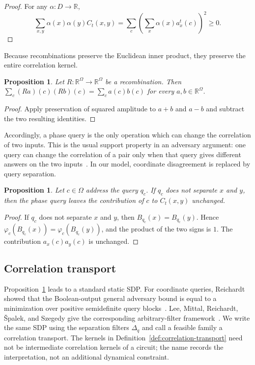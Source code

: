 \documentclass[11pt]{article}
\numberwithin{equation}{section}
\newtheorem{proposition}[definition]{Proposition}
\theoremstyle{remark}
\begin{document}
\begin{proof}
For any $\alpha:D\to\mathbb R$,
\begin{equation}
    \sum_{x,y}\alpha(x)\alpha(y)C_t(x,y)=\sum_c\left(\sum_x\alpha(x)a_x^t(c)\right)^2\geq0.
\end{equation}
\end{proof}

Because recombinations preserve the Euclidean inner product, they preserve the
entire correlation kernel.

\begin{proposition}
\label{prop:recombination-preserves-correlation}
Let $R:\mathbb R^\Omega\to\mathbb R^\Omega$ be a recombination. Then
$\sum_c(Ra)(c)(Rb)(c)=\sum_c a(c)b(c)$ for every
$a,b\in\mathbb R^\Omega$.
\end{proposition}

\begin{proof}
Apply preservation of squared amplitude to $a+b$ and $a-b$ and subtract the
two resulting identities.
\end{proof}

Accordingly, a phase query is the only operation which can change the correlation of two inputs. This is the usual support property in an adversary argument: one query can change the correlation of a pair only when that query gives different answers on the two inputs~\cite{HoyerLeeSpalek2007}. In our model, coordinate disagreement is replaced by query separation.

\begin{proposition}
\label{prop:query-correlation-support}
Let $c\in\Omega$ address the query $q_c$. If $q_c$ does not separate
$x$ and $y$, then the phase query leaves the contribution of $c$ to
$C_t(x,y)$ unchanged.
\end{proposition}

\begin{proof}
If $q_c$ does not separate $x$ and $y$, then
$B_{q_c}(x)=B_{q_c}(y)$. Hence
$\varphi_c(B_{q_c}(x))=\varphi_c(B_{q_c}(y))$, and the product of the two
signs is $1$. The contribution $a_x(c)a_y(c)$ is unchanged.
\end{proof}


\subsection{Correlation transport}
\label{subsec:static-correlation-transport}

Proposition~\ref{prop:query-correlation-support} leads to a standard static SDP. For coordinate queries, Reichardt showed that the Boolean-output general adversary bound is equal to a minimization over positive semidefinite query blocks~\cite{Reichardt2009}. Lee, Mittal, Reichardt, {\v S}palek, and Szegedy give the corresponding arbitrary-filter framework~\cite{LeeMittalReichardtSpalekSzegedy2011}. We write the same SDP using the separation filters $\Delta_q$ and call a feasible family a correlation transport. The kernels in Definition~\ref{def:correlation-transport} need not be intermediate correlation kernels of a circuit; the name records the interpretation, not an additional dynamical constraint.
\end{document}
